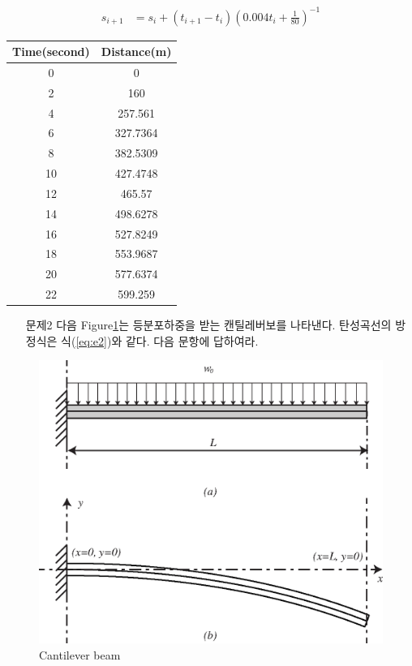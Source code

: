 \documentclass[a4,10pt]{article}
\numberwithin{algorithm}{section}
\theoremstyle{examplestyle}
\let\\\tabularnewline
\let\\\tabularnewline
\begin{document}
\begin{itemize}
\begin{align*}
s_{i+1}&=s_{i}+(t_{i+1}-t_{i}) \left(0.004t_{i}+\frac{1}{80}\right)^{-1}
\end{align*}
\begin{table}[!hbpt]
\centering
\begin{tabular}{c|c}
\hline\hline
Time(second)&Distance(m)\\
\hline
0&0\\
2&160\\
4&257.561\\
6&327.7364\\
8&382.5309\\
10&427.4748\\
12&465.57\\
14&498.6278\\
16&527.8249\\
18&553.9687\\
20&577.6374\\
22&599.259\\
\hline\hline
\end{tabular}
\end{table}

\end{itemize}

\begin{itemize}
\item[문제2] 다음 Figure\ref{fig:e2}는 등분포하중을 받는 캔틸레버보를 나타낸다. 탄성곡선의 방정식은 식(\ref{eq:e2})와 같다. 다음 문항에 답하여라.
\end{itemize}
\begin{figure}[!hbpt]
\centering
\includegraphics[keepaspectratio=true,width=0.6\linewidth]{midterm/2.eps}
\caption{Cantilever beam}
\label{fig:e2}
\end{figure}
\end{document}
